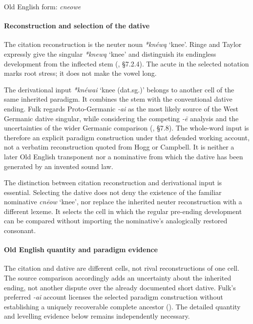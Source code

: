 \documentclass[
  british,
  a4paper,
]{article}
\providecommand{\Recon}[1]{\emph{*#1}}
\begin{document}
Old English form: \emph{cneowe}

\paragraph{Reconstruction and selection of the
dative}\label{reconstruction-and-selection-of-the-dative}

The citation reconstruction is the neuter noun \Recon{knéwą} `knee'.
Ringe and Taylor expressly give the singular \Recon{knewą} `knee' and
distinguish its endingless development from the inflected stem
(, §7.2.4).
The acute in the selected notation marks root stress; it does not make
the vowel long.

The derivational input \Recon{knéwai} `knee (dat.sg.)' belongs to
another cell of the same inherited paradigm. It combines the stem with
the conventional dative ending. Fulk regards Proto-Germanic \emph{-ai}
as the most likely source of the West Germanic dative singular, while
considering the competing \emph{-ē} analysis and the uncertainties of
the wider Germanic comparison (,
§7.8). The whole-word input is therefore an explicit paradigm
construction under that defended working account, not a verbatim
reconstruction quoted from Hogg or Campbell. It is neither a later Old
English transponent nor a nominative from which the dative has been
generated by an invented sound law.

The distinction between citation reconstruction and derivational input
is essential. Selecting the dative does not deny the existence of the
familiar nominative \emph{cnēow} `knee', nor replace the inherited
neuter reconstruction with a different lexeme. It selects the cell in
which the regular pre-ending development can be compared without
importing the nominative's analogically restored consonant.

\paragraph{Old English quantity and paradigm
evidence}\label{old-english-quantity-and-paradigm-evidence}

The citation and dative are different cells, not rival reconstructions
of one cell. The source comparison accordingly adds an uncertainty about
the inherited ending, not another dispute over the already documented
short dative. Fulk's preferred \emph{-ai} account licenses the selected
paradigm construction without establishing a uniquely recoverable
complete ancestor (). The
detailed quantity and levelling evidence below remains independently
necessary.
\end{document}
